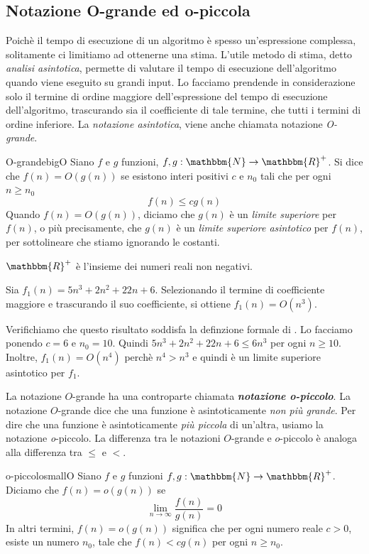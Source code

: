 \documentclass[12pt]{report}
\newcounter{definition}
\newcommand{\nmu}{}
\begin{document}
\subsection{Notazione O-grande ed o-piccola}
Poichè il tempo di esecuzione di un algoritmo è spesso un'espressione complessa, solitamente ci limitiamo ad ottenerne una stima. L'utile metodo di stima, detto \textit{analisi asintotica}, permette di valutare il tempo di esecuzione dell'algoritmo quando viene eseguito su grandi input. Lo facciamo prendende in considerazione solo il termine di ordine maggiore dell'espressione del tempo di esecuzione dell'algoritmo, trascurando sia il coefficiente di tale termine, che tutti i termini di ordine inferiore. La \textit{notazione asintotica}, viene anche chiamata notazione \textit{O-grande}.
\begin{definition}{\nmu O-grande}{bigO}
	Siano $f$ e $g$ funzioni, $f, g: \mathbbm{N} \to \mathbbm{R}^+$. Si dice che $f(n) = O(g(n))$ se esistono interi positivi $c$ e $n_0$ tali che per ogni $n \geq n_0$
	\[
	f(n) \leq cg(n)
	\]
	Quando $f(n) = O(g(n))$, diciamo che $g(n)$ è un \textit{limite superiore} per $f(n)$, o più precisamente, che $g(n)$ è un \textit{limite superiore asintotico} per $f(n)$, per sottolineare che stiamo ignorando le costanti.

	$\mathbbm{R}^+$ è l'insieme dei numeri reali non negativi.
\end{definition}
\begin{example}{}{}
Sia $f_1(n) = 5n^3 + 2n^2 + 22n + 6$. Selezionando il termine di coefficiente maggiore e trascurando il suo coefficiente, si ottiene $f_1(n) = O\left(n^3\right)$.

Verifichiamo che questo risultato soddisfa la definzione formale di . Lo facciamo ponendo $c = 6$ e $n_0 = 10$. Quindi $5n^3 + 2n^2 + 22n + 6 \leq 6n^3$ per ogni $n \geq 10$. Inoltre, $f_1(n)=O\left(n^4\right)$ perchè $n^4 > n^3$ e quindi è un limite superiore asintotico per $f_1$.
\end{example}
La notazione $O$-grande ha una controparte chiamata \textbf{\textit{notazione o-piccolo}}. La notazione $O$-grande dice che una funzione è asintoticamente \textit{non più grande}. Per dire che una funzione è asintoticamente \textit{più piccola} di un'altra, usiamo la notazione \textit{o}-piccolo. La differenza tra le notazioni $O$-grande e $o$-piccolo è analoga alla differenza tra $\leq$ e $<$.
\begin{definition}{\nmu o-piccolo}{smallO}
	Siano $f$ e $g$ funzioni $f, g: \mathbbm{N} \to \mathbbm{R}^+$. Diciamo che $f(n) = o(g(n))$ se
	\[
	\lim\limits_{n\to\infty}\frac{f(n)}{g(n)} = 0
	\]
	In altri termini, $f(n) = o(g(n))$ significa che per ogni numero reale $c > 0$, esiste un numero $n_0$, tale che $f(n) < cg(n)$ per ogni $n \geq n_0$.
\end{definition}
\end{document}
